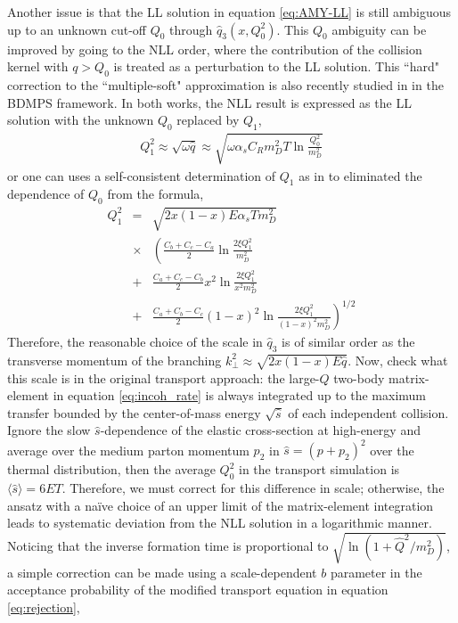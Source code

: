 \documentclass[aps, prc, reprint, amsmath, groupedaddress, nofootinbib]{revtex4-1}
\begin{document}
Another issue is that the LL solution in equation \ref{eq:AMY-LL} is still ambiguous up to an unknown cut-off $Q_0$ through $\hat{q}_3(x, Q_0^2)$.
This $Q_0$ ambiguity can be improved by going to the NLL order, where the contribution of the collision kernel with $q>Q_0$ is treated as a perturbation to the LL solution.
This ``hard" correction to the ``multiple-soft" approximation is also recently studied in \cite{Mehtar-Tani:2019tvy} in the BDMPS framework.
In both works, the NLL result is expressed as the LL solution with the unknown $Q_0$ replaced by $Q_1$,
\begin{eqnarray}
Q_1^2  \approx \sqrt{\omega \hat{q}} \approx \sqrt{\omega \alpha_s C_R m_D^2 T \ln\frac{Q_0^2}{m_D^2}}
\label{eq:Q1}
\end{eqnarray}
or one can uses a self-consistent determination of $Q_1$ as in \cite{Arnold:2008zu} to eliminated the dependence of $Q_0$ from the formula,
\begin{eqnarray}
Q_1^2 &=& \sqrt{2 x (1-x) E \alpha_s T m_D^2}\\\nonumber
&\times & \left(
\frac{C_b+C_c-C_a}{2}\ln\frac{2\xi Q_1^2}{m_D^2} \right.\\\nonumber 
&+& \frac{C_a+C_c-C_b}{2} x^2 \ln\frac{2\xi Q_1^2}{x^2 m_D^2} \\\nonumber 
&+& \left.\frac{C_a+C_b-C_c}{2} (1-x)^2 \ln\frac{2\xi Q_1^2}{(1-x)^2 m_D^2} \right)^{1/2}
\label{eq:Q1-sf}
\end{eqnarray}
Therefore, the reasonable choice of the scale in $\hat{q}_3$ is of similar order as the transverse momentum of the branching $k_\perp^2 \approx \sqrt{2x(1-x)E \hat{q}}$.
Now, check what this scale is in the original transport approach: the large-$Q$ two-body matrix-element in equation \ref{eq:incoh_rate} is always integrated up to the maximum transfer bounded by the center-of-mass energy $\sqrt{\hat{s}}$ of each independent collision. 
Ignore the slow $\hat{s}$-dependence of the elastic cross-section at high-energy and average over the medium parton momentum $p_2$ in $\hat{s} = (p+p_2)^2$ over the thermal distribution, then the average $Q_{0}^2$ in the transport simulation is  $\langle\hat{s}\rangle = 6ET$.
Therefore, we must correct for this difference in scale; otherwise, the ansatz with a na\"ive choice of an upper limit of the matrix-element integration leads to systematic deviation from the NLL solution in a logarithmic manner.
Noticing that the inverse formation time is proportional to $\sqrt{\ln(1+\hat{Q}^2/m_D^2)}$, a simple correction can be made using a scale-dependent $b$ parameter in the acceptance probability of the modified transport equation in equation \ref{eq:rejection},
\end{document}
